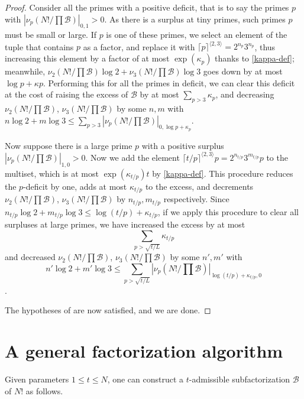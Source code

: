 \documentclass[12pt,a4paper,reqno]{amsart}
\numberwithin{equation}{section}
\theoremstyle{plain}
\theoremstyle{definition}
\newcommand\tuple{{\mathcal B}}
\begin{document}
\begin{proof} Consider all the primes with a positive deficit, that is to say the primes $p$ with $|\nu_p(N!/\prod \tuple)|_{0,1} > 0$.  As there is a surplus at tiny primes, such primes $p$ must be small or large.  If $p$ is one of these primes, we select an element of the tuple that contains $p$ as a factor, and replace it with $\lceil p\rceil^{\langle 2,3 \rangle} = 2^{n_p} 3^{n_p}$, thus increasing this element by a factor of at most $\exp(\kappa_p)$ thanks to \eqref{kappa-def}; meanwhile, $\nu_2(N!/\prod \tuple) \log 2 + \nu_3(N!/\prod \tuple) \log 3$ goes down by at most $\log p + \kappa p$.  Performing this for all the primes in deficit, we can clear this deficit at the cost of raising the excess of $\tuple$ by at most $\sum_{p>3} \kappa_p$, and decreasing $\nu_2(N!/\prod \tuple)$, $\nu_3(N!/\prod \tuple)$ by some $n,m$ with $n \log 2 + m \log 3 \leq \sum_{p>3} |\nu_p(N!/\prod \tuple)|_{0,\log p+\kappa_p}$.  

Now suppose there is a large prime $p$ with a positive surplus
$|\nu_p(N!/\prod \tuple)|_{1,0} > 0$.  Now we add the element $\lceil t/p \rceil^{\langle 2,3 \rangle} p = 2^{n_{t/p}} 3^{m_{t/p}} p$ to the multiset, which is at most $\exp(\kappa_{t/p}) t$ by \eqref{kappa-def}.  This procedure reduces the $p$-deficit by one, adds at most $\kappa_{t/p}$ to the excess, and decrements $\nu_2(N!/\prod \tuple)$, $\nu_3(N!/\prod \tuple)$ by $n_{t/p}, m_{t/p}$ respectively.  Since $n_{t/p} \log 2 + m_{t/p} \log 3 \leq \log(t/p) + \kappa_{t/p}$, if we apply this procedure to clear all surpluses at large primes, we have increased the excess by at most
$$ \sum_{p > \sqrt{t/L}} \kappa_{t/p}$$
and decreased $\nu_2(N!/\prod \tuple)$, $\nu_3(N!/\prod \tuple)$ by some $n',m'$ with 
$$n' \log 2 + m' \log 3 \leq \sum_{p>\sqrt{t/L}} |\nu_p(N!/\prod \tuple)|_{\log(t/p)+\kappa_{t/p},0}$$.  

The hypotheses of  are now satisfied, and we are done.
\end{proof}

\section{A general factorization algorithm}

Given parameters $1 \leq t \leq N$, one can construct a $t$-admissible subfactorization $\tuple$ of $N!$ as follows.
\end{document}
